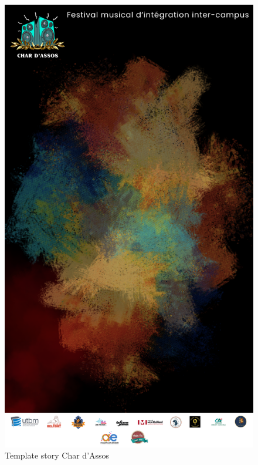 \begin{figure}[!h]
    \begin{center}
        \includegraphics[scale=0.3]{ressources/Char_Dassos/1}
        \caption{Template story Char d'Assos \label{fig:storyCharDassos}}
    \end{center}
\end{figure}


